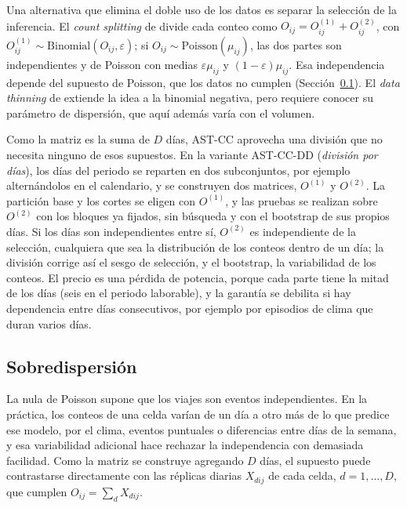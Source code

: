 Una alternativa que elimina el doble uso de los datos es separar la selección de
la inferencia. El \emph{count splitting} de \cite{Neufeld2024cs} divide cada
conteo como $O_{ij} = O^{(1)}_{ij} + O^{(2)}_{ij}$, con
$O^{(1)}_{ij}\sim\mathrm{Binomial}(O_{ij},\varepsilon)$; si
$O_{ij}\sim\mathrm{Poisson}(\mu_{ij})$, las dos partes son independientes y de
Poisson con medias $\varepsilon\mu_{ij}$ y $(1-\varepsilon)\mu_{ij}$. Esa
independencia depende del supuesto de Poisson, que los datos no cumplen
(Sección~\ref{sec:prop-sobredispersion}). El \emph{data thinning} de
\cite{Neufeld2024dt} extiende la idea a la binomial negativa, pero requiere
conocer su parámetro de dispersión, que aquí además varía con el volumen.

Como la matriz es la suma de $D$ días, AST-CC aprovecha una división que no
necesita ninguno de esos supuestos. En la variante AST-CC-DD (\emph{división por
días}), los días del periodo se reparten en dos subconjuntos, por ejemplo
alternándolos en el calendario, y se construyen dos matrices, $O^{(1)}$ y
$O^{(2)}$. La partición base y los cortes se eligen con $O^{(1)}$, y las pruebas
se realizan sobre $O^{(2)}$ con los bloques ya fijados, sin búsqueda y con el
bootstrap de sus propios días. Si los días son independientes entre sí,
$O^{(2)}$ es independiente de la selección, cualquiera que sea la distribución
de los conteos dentro de un día; la división corrige así el sesgo de selección,
y el bootstrap, la variabilidad de los conteos. El precio es
una pérdida de potencia, porque cada parte tiene la mitad de los días
(seis en el periodo laborable), y la garantía se debilita si hay dependencia
entre días consecutivos, por ejemplo por episodios de clima que duran varios
días.

\subsection{Sobredispersión}\label{sec:prop-sobredispersion}

La nula de Poisson supone que los viajes son eventos independientes. En la
práctica, los conteos de una celda varían de un día a otro más de lo que
predice ese modelo, por el clima, eventos puntuales o diferencias entre días de
la semana, y esa variabilidad adicional hace rechazar la independencia con
demasiada facilidad. Como la matriz se construye agregando $D$ días, el supuesto
puede contrastarse directamente con las réplicas diarias $X_{dij}$ de cada
celda, $d = 1,\dots,D$, que cumplen $O_{ij} = \sum_d X_{dij}$.

